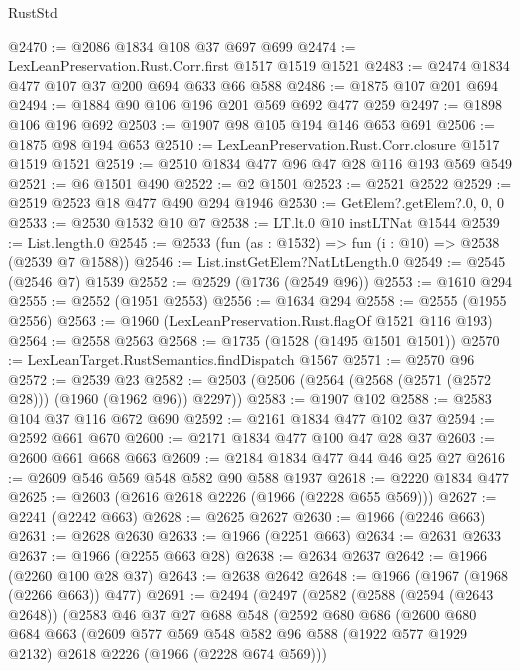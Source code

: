 \begin{lexlean}{RustStd}
\begin{coremodule}
@2470 := @2086 @1834 @108 @37 @697 @699
@2474 := LexLeanPreservation.Rust.Corr.first @1517 @1519 @1521
@2483 := @2474 @1834 @477 @107 @37 @200 @694 @633 @66 @588
@2486 := @1875 @107 @201 @694
@2494 := @1884 @90 @106 @196 @201 @569 @692 @477 @259
@2497 := @1898 @106 @196 @692
@2503 := @1907 @98 @105 @194 @146 @653 @691
@2506 := @1875 @98 @194 @653
@2510 := LexLeanPreservation.Rust.Corr.closure @1517 @1519 @1521
@2519 := @2510 @1834 @477 @96 @47 @28 @116 @193 @569 @549
@2521 := @6 @1501 @490
@2522 := @2 @1501
@2523 := @2521 @2522
@2529 := @2519 @2523 @18 @477 @490 @294 @1946
@2530 := GetElem?.getElem?.{0, 0, 0}
@2533 := @2530 @1532 @10 @7
@2538 := LT.lt.{0} @10 instLTNat @1544
@2539 := List.length.{0}
@2545 := @2533 (fun (as : @1532) => fun (i : @10) => @2538 (@2539 @7 @1588))
@2546 := List.instGetElem?NatLtLength.{0}
@2549 := @2545 (@2546 @7) @1539
@2552 := @2529 (@1736 (@2549 @96))
@2553 := @1610 @294
@2555 := @2552 (@1951 @2553)
@2556 := @1634 @294
@2558 := @2555 (@1955 @2556)
@2563 := @1960 (LexLeanPreservation.Rust.flagOf @1521 @116 @193)
@2564 := @2558 @2563
@2568 := @1735 (@1528 (@1495 @1501 @1501))
@2570 := LexLeanTarget.RustSemantics.findDispatch @1567
@2571 := @2570 @96
@2572 := @2539 @23
@2582 := @2503 (@2506 (@2564 (@2568 (@2571 (@2572 @28))) (@1960 (@1962 @96)) @2297))
@2583 := @1907 @102
@2588 := @2583 @104 @37 @116 @672 @690
@2592 := @2161 @1834 @477 @102 @37
@2594 := @2592 @661 @670
@2600 := @2171 @1834 @477 @100 @47 @28 @37
@2603 := @2600 @661 @668 @663
@2609 := @2184 @1834 @477 @44 @46 @25 @27
@2616 := @2609 @546 @569 @548 @582 @90 @588 @1937
@2618 := @2220 @1834 @477
@2625 := @2603 (@2616 @2618 @2226 (@1966 (@2228 @655 @569)))
@2627 := @2241 (@2242 @663)
@2628 := @2625 @2627
@2630 := @1966 (@2246 @663)
@2631 := @2628 @2630
@2633 := @1966 (@2251 @663)
@2634 := @2631 @2633
@2637 := @1966 (@2255 @663 @28)
@2638 := @2634 @2637
@2642 := @1966 (@2260 @100 @28 @37)
@2643 := @2638 @2642
@2648 := @1966 (@1967 (@1968 (@2266 @663)) @477)
@2691 := @2494
    (@2497
      (@2582
        (@2588
          (@2594 (@2643 @2648))
          (@2583
            @46
            @37
            @27
            @688
            @548
            (@2592
              @680
              @686
              (@2600
                @680
                @684
                @663
                (@2609
                  @577
                  @569
                  @548
                  @582
                  @96
                  @588
                  (@1922 @577 @1929 @2132)
                  @2618
                  @2226
                  (@1966 (@2228 @674 @569)))

\end{coremodule}
\end{lexlean}
